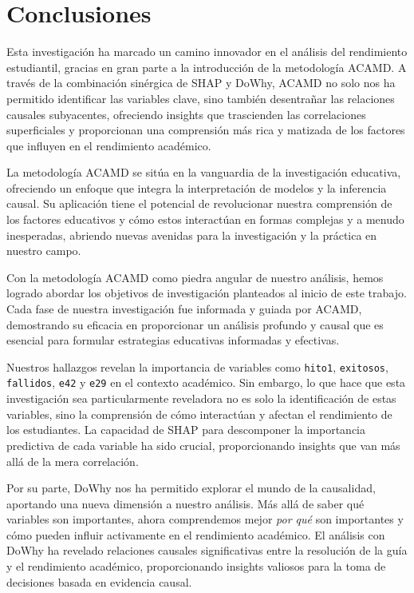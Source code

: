 \section{Conclusiones}\label{Conclusiones}
Esta investigación ha marcado un camino innovador en el análisis del rendimiento estudiantil, gracias en gran parte a la introducción de la metodología ACAMD. A través de la combinación sinérgica de SHAP y DoWhy, ACAMD no solo nos ha permitido identificar las variables clave, sino también desentrañar las relaciones causales subyacentes, ofreciendo insights que trascienden las correlaciones superficiales y proporcionan una comprensión más rica y matizada de los factores que influyen en el rendimiento académico.

La metodología ACAMD se sitúa en la vanguardia de la investigación educativa, ofreciendo un enfoque que integra la interpretación de modelos y la inferencia causal. Su aplicación tiene el potencial de revolucionar nuestra comprensión de los factores educativos y cómo estos interactúan en formas complejas y a menudo inesperadas, abriendo nuevas avenidas para la investigación y la práctica en nuestro campo.

Con la metodología ACAMD como piedra angular de nuestro análisis, hemos logrado abordar los objetivos de investigación planteados al inicio de este trabajo. Cada fase de nuestra investigación fue informada y guiada por ACAMD, demostrando su eficacia en proporcionar un análisis profundo y causal que es esencial para formular estrategias educativas informadas y efectivas.

Nuestros hallazgos revelan la importancia de variables como \texttt{hito1}, \texttt{exitosos}, \texttt{fallidos}, \texttt{e42} y \texttt{e29} en el contexto académico. Sin embargo, lo que hace que esta investigación sea particularmente reveladora no es solo la identificación de estas variables, sino la comprensión de cómo interactúan y afectan el rendimiento de los estudiantes. La capacidad de SHAP para descomponer la importancia predictiva de cada variable ha sido crucial, proporcionando insights que van más allá de la mera correlación.

Por su parte, DoWhy nos ha permitido explorar el mundo de la causalidad, aportando una nueva dimensión a nuestro análisis. Más allá de saber qué variables son importantes, ahora comprendemos mejor \textit{por qué} son importantes y cómo pueden influir activamente en el rendimiento académico. El análisis con DoWhy ha revelado relaciones causales significativas entre la resolución de la guía y el rendimiento académico, proporcionando insights valiosos para la toma de decisiones basada en evidencia causal.

